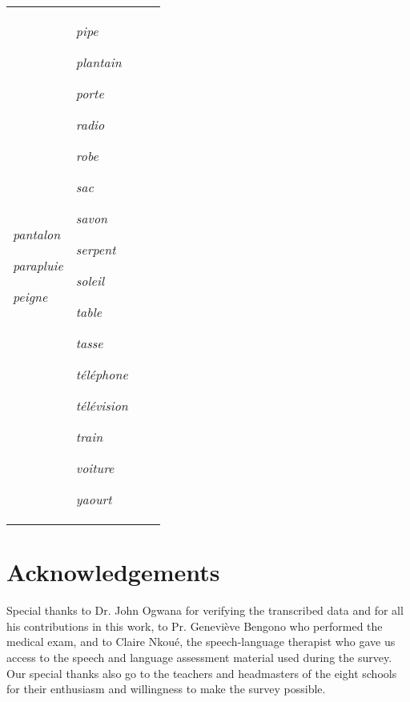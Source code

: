 \documentclass[output=paper,newtxmath,modfonts,nonflat,draftmode]{langsci/langscibook}
\begin{document}
\begin{tabularx}{\textwidth}{@{}XXXX@{}}
\textit{pantalon}

\textit{parapluie}

\textit{peigne} & \textit{pipe}

\textit{plantain~}

\textit{porte}

\textit{radio}

\textit{robe}

\textit{sac}

\textit{savon}

\textit{serpent}

\textit{soleil}

\textit{table}

\textit{tasse}

\textit{téléphone}

\textit{télévision}

\textit{train}

\textit{voiture}

\textit{yaourt}\\
\end{tabularx}


\section*{Acknowledgements}

Special thanks to Dr. John Ogwana for verifying the transcribed data and for all his contributions in this work, to Pr. Geneviève Bengono who performed the medical exam, and to Claire Nkoué, the speech-language therapist who gave us access to the speech and language assessment material used during the survey. Our special thanks also go to the teachers and headmasters of the eight schools for their enthusiasm and willingness to make the survey possible.

{\sloppy
\printbibliography[heading=subbibliography,notkeyword=this] 
}
\end{document}

